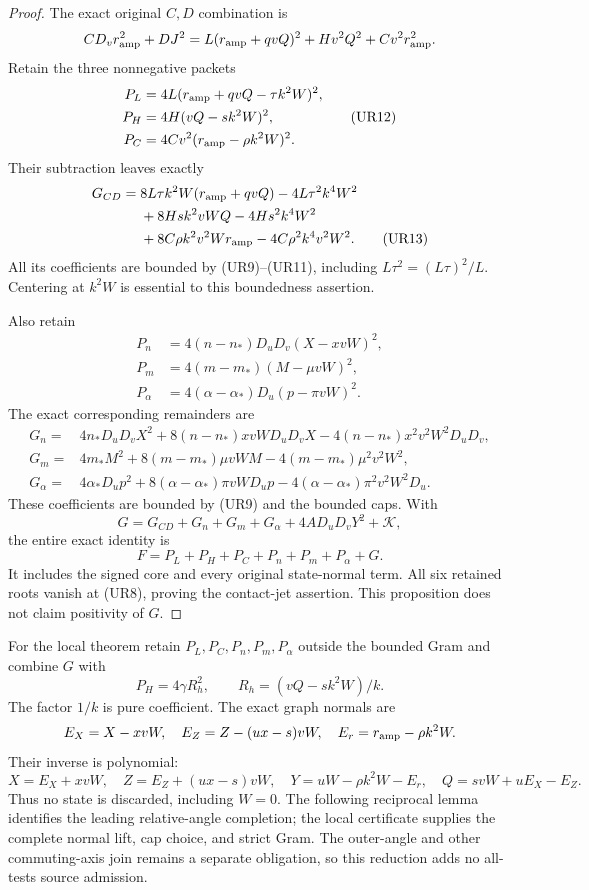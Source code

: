 \begin{proof}
The exact original $C,D$ combination is
\[
 CD_vr_{\rm amp}^2+DJ^2
   =L(r_{\rm amp}+qvQ)^2+Hv^2Q^2+Cv^2r_{\rm amp}^2.
\]
Retain the three nonnegative packets
\[
 \begin{aligned}
 P_L&=4L(r_{\rm amp}+qvQ-\tau k^2W)^2,\\
 P_H&=4H(vQ-sk^2W)^2,\\
 P_C&=4Cv^2(r_{\rm amp}-\rho k^2W)^2.
 \end{aligned}                                                   \tag{UR12}
\]
Their subtraction leaves exactly
\begin{align*}
 G_{CD}={}&8L\tau k^2W(r_{\rm amp}+qvQ)-4L\tau^2k^4W^2\\
 &+8Hs k^2vWQ-4Hs^2k^4W^2\\
 &+8C\rho k^2v^2Wr_{\rm amp}-4C\rho^2k^4v^2W^2.
 \tag{UR13}
\end{align*}
All its coefficients are bounded by (UR9)--(UR11), including
$L\tau^2=(L\tau)^2/L$. Centering at $k^2W$ is essential to this
boundedness assertion.

Also retain
\[
 \begin{aligned}
 P_n&=4(n-n_*)D_uD_v(X-xvW)^2,\\
 P_m&=4(m-m_*)(M-\mu vW)^2,\\
 P_\alpha&=4(\alpha-\alpha_*)D_u(p-\pi vW)^2.
 \end{aligned}                                                   \tag{UR14}
\]
The exact corresponding remainders are
\[
 \begin{aligned}
 G_n={}&4n_*D_uD_vX^2+8(n-n_*)xvWD_uD_vX
                    -4(n-n_*)x^2v^2W^2D_uD_v,\\
 G_m={}&4m_*M^2+8(m-m_*)\mu vWM
                    -4(m-m_*)\mu^2v^2W^2,\\
 G_\alpha={}&4\alpha_*D_up^2+8(\alpha-\alpha_*)\pi vWD_up
                    -4(\alpha-\alpha_*)\pi^2v^2W^2D_u.
 \end{aligned}                                                   \tag{UR15}
\]
These coefficients are bounded by (UR9) and the bounded caps. With
\[
 G=G_{CD}+G_n+G_m+G_\alpha+4AD_uD_vY^2+\mathcal K,
\]
the entire exact identity is
\[
 F=P_L+P_H+P_C+P_n+P_m+P_\alpha+G.                 \tag{UR16}
 \label{pc3daa35e9a9b:eq:ui-entire-reduction}
\]
It includes the signed core and every original state-normal term.
All six retained roots vanish at (UR8), proving the contact-jet
assertion. This proposition does not claim positivity of $G$.
\end{proof}

For the local theorem retain $P_L,P_C,P_n,P_m,P_\alpha$ outside the
bounded Gram and combine $G$ with
\[
 P_H=4\gamma R_h^2,\qquad R_h=(vQ-sk^2W)/k.
 \tag{UR17}
\]
The factor $1/k$ is pure coefficient. The exact graph normals are
\[
 E_X=X-xvW,\quad E_Z=Z-(ux-s)vW,\quad
 E_r=r_{\rm amp}-\rho k^2W.
\]
Their inverse is polynomial:
\[
 X=E_X+xvW,\quad Z=E_Z+(ux-s)vW,\quad
 Y=uW-\rho k^2W-E_r,\quad Q=svW+uE_X-E_Z.
\]
Thus no state is discarded, including $W=0$. The following reciprocal
lemma identifies the leading relative-angle completion; the local
certificate supplies the complete normal lift, cap choice, and strict
Gram. The outer-angle and other commuting-axis join remains a separate
obligation, so this reduction adds no all-tests source admission.
